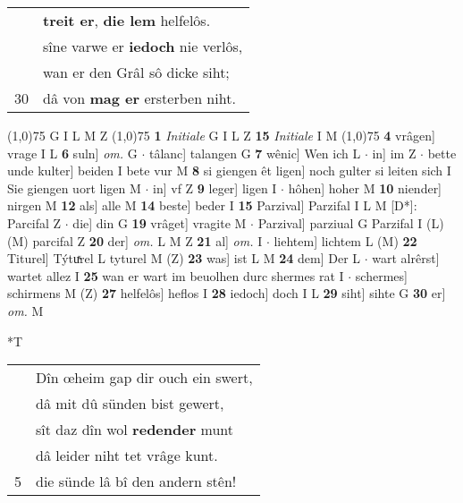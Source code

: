 \documentclass[8pt,a4paper,notitlepage]{article}
\begin{document}
\begin{table}[ht]
\begin{minipage}[t]{0.5\linewidth}
\begin{tabular}{rl}
 & \textbf{treit er}, \textbf{die lem} helfelôs.\\ 
 & sîne varwe er \textbf{iedoch} nie verlôs,\\ 
 & wan er den Grâl sô dicke siht;\\ 
30 & dâ von \textbf{mag er} ersterben niht.\\ 
\end{tabular}
\scriptsize
\line(1,0){75} \newline
G I L M Z \newline
\line(1,0){75} \newline
\textbf{1} \textit{Initiale} G I L Z  \textbf{15} \textit{Initiale} I M  \newline
\line(1,0){75} \newline
\textbf{4} vrâgen] vrage I L \textbf{6} suln] \textit{om.} G  $\cdot$ tâlanc] talangen G \textbf{7} wênic] Wen ich L  $\cdot$ in] im Z  $\cdot$ bette unde kulter] beiden I bete vur M \textbf{8} si giengen êt ligen] noch gulter si leiten sich I Sie giengen uort ligen M  $\cdot$ in] vf Z \textbf{9} leger] ligen I  $\cdot$ hôhen] hoher M \textbf{10} niender] nirgen M \textbf{12} als] alle M \textbf{14} beste] beder I \textbf{15} Parzival] Parzifal I L M [D*]: Parcifal Z  $\cdot$ die] din G \textbf{19} vrâget] vragite M  $\cdot$ Parzival] parziual G Parzifal I (L) (M) parcifal Z \textbf{20} der] \textit{om.} L M Z \textbf{21} al] \textit{om.} I  $\cdot$ liehtem] lichtem L (M) \textbf{22} Titurel] Týtuͯrel L tyturel M (Z) \textbf{23} was] ist L M \textbf{24} dem] Der L  $\cdot$ wart alrêrst] wartet allez I \textbf{25} wan er wart im beuolhen durc shermes rat I  $\cdot$ schermes] schirmens M (Z) \textbf{27} helfelôs] heflos I \textbf{28} iedoch] doch I L \textbf{29} siht] sihte G \textbf{30} er] \textit{om.} M \newline
\end{minipage}
\hspace{0.5cm}
\begin{minipage}[t]{0.5\linewidth}
\small
\begin{center}*T
\end{center}
\begin{tabular}{rl}
 & Dîn œheim gap dir ouch ein swert,\\ 
 & dâ mit dû sünden bist gewert,\\ 
 & sît daz dîn wol \textbf{redender} munt\\ 
 & dâ leider niht tet vrâge kunt.\\ 
5 & die sünde lâ bî den andern stên!\\ 

\end{tabular}
\end{minipage}
\end{table}
\end{document}

